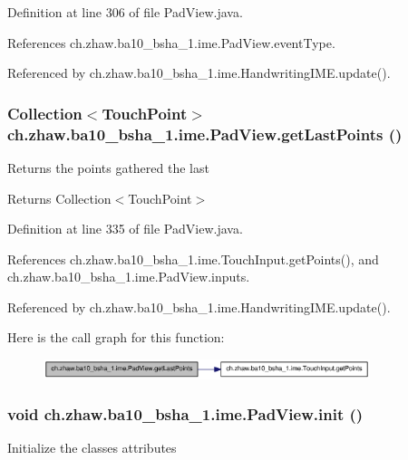 Definition at line 306 of file PadView.java.

References ch.zhaw.ba10\_\-bsha\_\-1.ime.PadView.eventType.

Referenced by ch.zhaw.ba10\_\-bsha\_\-1.ime.HandwritingIME.update().\hypertarget{classch_1_1zhaw_1_1ba10__bsha__1_1_1ime_1_1PadView_aea9a4c4f77ccfdfddfad16cdcc200107}{
\subsubsection[{getLastPoints}]{\setlength{\rightskip}{0pt plus 5cm}Collection$<${\bf TouchPoint}$>$ ch.zhaw.ba10\_\-bsha\_\-1.ime.PadView.getLastPoints ()}}
\label{classch_1_1zhaw_1_1ba10__bsha__1_1_1ime_1_1PadView_aea9a4c4f77ccfdfddfad16cdcc200107}
Returns the points gathered the last

\begin{DoxyReturn}{Returns}
Collection$<$TouchPoint$>$ 
\end{DoxyReturn}


Definition at line 335 of file PadView.java.

References ch.zhaw.ba10\_\-bsha\_\-1.ime.TouchInput.getPoints(), and ch.zhaw.ba10\_\-bsha\_\-1.ime.PadView.inputs.

Referenced by ch.zhaw.ba10\_\-bsha\_\-1.ime.HandwritingIME.update().

Here is the call graph for this function:\nopagebreak
\begin{figure}[H]
\begin{center}
\leavevmode
\includegraphics[width=270pt]{classch_1_1zhaw_1_1ba10__bsha__1_1_1ime_1_1PadView_aea9a4c4f77ccfdfddfad16cdcc200107_cgraph}
\end{center}
\end{figure}
\hypertarget{classch_1_1zhaw_1_1ba10__bsha__1_1_1ime_1_1PadView_a7f6b9437957e161e9ddef40f1aff665a}{
\subsubsection[{init}]{\setlength{\rightskip}{0pt plus 5cm}void ch.zhaw.ba10\_\-bsha\_\-1.ime.PadView.init ()}}
\label{classch_1_1zhaw_1_1ba10__bsha__1_1_1ime_1_1PadView_a7f6b9437957e161e9ddef40f1aff665a}
Initialize the classes attributes 

